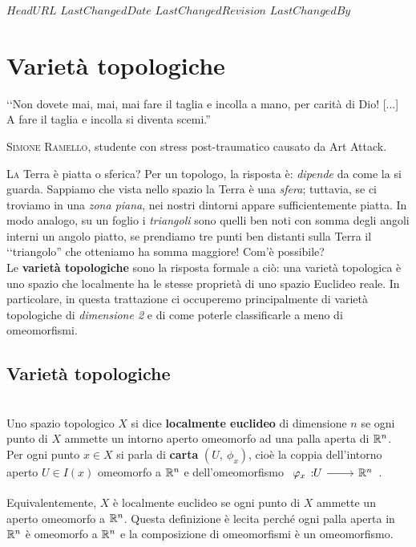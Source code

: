 \svnidlong
{$HeadURL$}
{$LastChangedDate$}
{$LastChangedRevision$}
{$LastChangedBy$}

\chapter{Varietà topologiche}

\begin{introduction}
	‘‘Non dovete mai, mai, mai fare il taglia e incolla a mano, per carità di Dio! [...] A fare il taglia e incolla si diventa scemi.''
	\begin{flushright}
		\textsc{Simone Ramello,} studente con stress post-traumatico causato da Art Attack.
	\end{flushright}
\end{introduction}
\lettrine[findent=1pt, nindent=0pt]{L}{a} Terra è piatta o sferica? Per un topologo, la risposta è: \textit{dipende} da come la si guarda. Sappiamo che vista nello spazio la Terra è una \textit{sfera}; tuttavia, se ci troviamo in una \textit{zona piana}, nei nostri dintorni appare sufficientemente piatta. In modo analogo, su un foglio i \textit{triangoli} sono quelli ben noti con somma degli angoli interni un angolo piatto, se prendiamo tre punti ben distanti sulla Terra il ‘‘triangolo'' che otteniamo ha somma maggiore! Com'è possibile?\\
Le \textbf{varietà topologiche} sono la risposta formale a ciò: una varietà topologica è uno spazio che localmente ha le stesse proprietà di uno spazio Euclideo reale. In particolare, in questa trattazione ci occuperemo principalmente di varietà topologiche di \textit{dimensione 2} e di come poterle classificarle a meno di omeomorfismi.
\section{Varietà topologiche}
\begin{define}~{}\\
	Uno spazio topologico $X$ si dice \textbf{localmente euclideo} di dimensione $n$ se ogni punto di $X$ ammette un intorno aperto omeomorfo ad una palla aperta di $\mathbb{R}^n$. Per ogni punto $x\in X$ si parla di \textbf{carta} $\left(U,\ \phi_x\right)$, cioè la coppia dell'intorno aperto $U\in I\left(x\right)$ omeomorfo a $\mathbb{R}^n$ e dell'omeomorfismo $\funz{\phi_x}{U}{\realset^n}$.
\end{define}
\begin{observe}
	Equivalentemente, $X$ è localmente euclideo se ogni punto di $X$ ammette un aperto omeomorfo a $\mathbb{R}^n$. Questa definizione è lecita perché ogni palla aperta in $\mathbb{R}^n$ è omeomorfo a $\mathbb{R}^n$ e la composizione di omeomorfismi è un omeomorfismo.
\end{observe}

